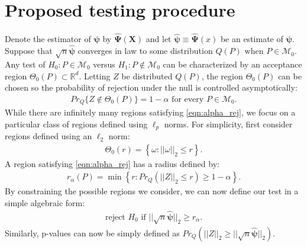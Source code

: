 \documentclass{article}
\newcommand{\rvo}{X}
\newcommand{\disto}{P}
\newcommand{\rvv}{Z}
\newcommand{\distv}{Q}
\begin{document}
\section{Proposed testing procedure}
\label{sec:prop_test_proc}
Denote the estimator of $\boldsymbol{\psi}$ by $\hat{\boldsymbol{\Psi}}(\boldsymbol{\rvo})$ and let $\hat{\boldsymbol{\psi}} \equiv \hat{\boldsymbol{\Psi}}(x)$ be an estimate of $\boldsymbol{\psi}$. Suppose that $\sqrt{n}\hat{\boldsymbol{\psi}}$ converges in law to some distribution $\distv(P)$ when $\disto \in \mathscr{M}_0$.  Any test of $H_0 : \disto \in \mathscr{M}_0$ versus $H_1 : \disto \not\in \mathscr{M}_0$ can be characterized by an acceptance region $\Theta_0(\disto) \subset \mathbb{R}^d$. Letting $\rvv$ be distributed $\distv(\disto)$, the region $\Theta_0(\disto)$ can be chosen so the probability of rejection under the null is controlled asymptotically:
\begin{align}
  Pr_{\distv}\{\rvv \not \in \Theta_0(P)\} = 1 - \alpha \text{ for every } P \in \mathscr{M}_0.\label{eqn:alpha_rej}
\end{align}
While there are infinitely many regions satisfying \eqref{eqn:alpha_rej},  we focus on a particular class of regions defined using $\ell_p$ norms. For simplicity, first consider regions defined using an $\ell_2$ norm:
\begin{align*}
	\Theta_0(r) = \left\{\omega : ||\omega||_2 \leq r\right\}.
\end{align*}
A region satisfying \eqref{eqn:alpha_rej} has a radius defined by: 
\begin{align*}
	r_\alpha(\disto) = \min\left\{r : Pr_{\distv}(||\rvv||_2 \leq r) \geq 1 - \alpha \right\}.
\end{align*}
By constraining the possible regions we consider, we can now define our test in a simple algebraic form:
\begin{align*}
	\text{reject } H_0 \text{ if } ||\sqrt{n} \hat{\boldsymbol{\psi}}||_2 \geq r_\alpha.
\end{align*}
Similarly, p-values can now be simply defined as $Pr_Q(||\rvv||_2 \geq ||\sqrt{n} \hat{\boldsymbol{\psi}}||_2)$.
\end{document}
